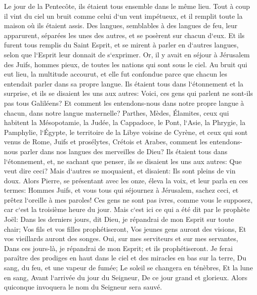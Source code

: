 \verse Le jour de la Pentecôte, ils étaient tous ensemble dans le même lieu. 
\verse Tout à coup il vint du ciel un bruit comme celui d`un vent impétueux, et il remplit toute la maison où ils étaient assis. 
\verse Des langues, semblables à des langues de feu, leur apparurent, séparées les unes des autres, et se posèrent sur chacun d`eux. 
\verse Et ils furent tous remplis du Saint Esprit, et se mirent à parler en d`autres langues, selon que l`Esprit leur donnait de s`exprimer. 
\verse Or, il y avait en séjour à Jérusalem des Juifs, hommes pieux, de toutes les nations qui sont sous le ciel. 
\verse Au bruit qui eut lieu, la multitude accourut, et elle fut confondue parce que chacun les entendait parler dans sa propre langue. 
\verse Ils étaient tous dans l`étonnement et la surprise, et ils se disaient les uns aux autres: Voici, ces gens qui parlent ne sont-ils pas tous Galiléens? 
\verse Et comment les entendons-nous dans notre propre langue à chacun, dans notre langue maternelle? 
\verse Parthes, Mèdes, Élamites, ceux qui habitent la Mésopotamie, la Judée, la Cappadoce, le Pont, l`Asie, 
\verse la Phrygie, la Pamphylie, l`Égypte, le territoire de la Libye voisine de Cyrène, et ceux qui sont venus de Rome, Juifs et prosélytes, 
\verse Crétois et Arabes, comment les entendons-nous parler dans nos langues des merveilles de Dieu? 
\verse Ils étaient tous dans l`étonnement, et, ne sachant que penser, ils se disaient les uns aux autres: Que veut dire ceci? 
\verse Mais d`autres se moquaient, et disaient: Ils sont pleins de vin doux. 
\verse Alors Pierre, se présentant avec les onze, éleva la voix, et leur parla en ces termes: Hommes Juifs, et vous tous qui séjournez à Jérusalem, sachez ceci, et prêtez l`oreille à mes paroles! 
\verse Ces gens ne sont pas ivres, comme vous le supposez, car c`est la troisième heure du jour. 
\verse Mais c`est ici ce qui a été dit par le prophète Joël: 
\verse Dans les derniers jours, dit Dieu, je répandrai de mon Esprit sur toute chair; Vos fils et vos filles prophétiseront, Vos jeunes gens auront des visions, Et vos vieillards auront des songes. 
\verse Oui, sur mes serviteurs et sur mes servantes, Dans ces jours-là, je répandrai de mon Esprit; et ils prophétiseront. 
\verse Je ferai paraître des prodiges en haut dans le ciel et des miracles en bas sur la terre, Du sang, du feu, et une vapeur de fumée; 
\verse Le soleil se changera en ténèbres, Et la lune en sang, Avant l`arrivée du jour du Seigneur, De ce jour grand et glorieux. 
\verse Alors quiconque invoquera le nom du Seigneur sera sauvé. 
